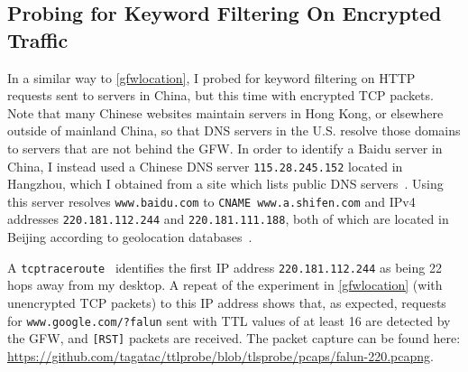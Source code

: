 \subsection{Probing for Keyword Filtering On Encrypted Traffic}\label{gfwtls}
In a similar way to \autoref{gfwlocation}, I probed for keyword filtering on HTTP requests sent to servers in China, but this time with encrypted TCP packets.
Note that many Chinese websites maintain servers in Hong Kong, or elsewhere outside of mainland China, so that DNS servers in the U.S. resolve those domains to servers that are not behind the GFW.
In order to identify a Baidu server in China, I instead used a Chinese DNS server \texttt{115.28.245.152} located in Hangzhou, which I obtained from a site which lists public DNS servers~\cite{PublicDNS}.
Using this server resolves \texttt{www.baidu.com} to \texttt{CNAME www.a.shifen.com} and IPv4 addresses \texttt{220.181.112.244} and \texttt{220.181.111.188}, both of which are located in Beijing according to geolocation databases~\cite{IPLookup244,IPLookup188}.

A \texttt{tcptraceroute}~\cite{Toren2006} identifies the first IP address \texttt{220.181.112.244} as being 22 hops away from my desktop.
A repeat of the experiment in \autoref{gfwlocation} (with unencrypted TCP packets) to this IP address shows that, as expected, requests for \texttt{www.google.com/?falun} sent with TTL values of at least 16 are detected by the GFW, and \texttt{[RST]} packets are received.
The packet capture can be found here: \url{https://github.com/tagatac/ttlprobe/blob/tlsprobe/pcaps/falun-220.pcapng}.

